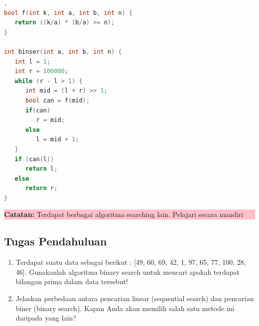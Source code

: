 \begin{lstlisting}[language=c,caption=Implementasi Binary Search],   
bool f(int k, int a, int b, int n) {
   return ((k/a) * (b/a) >= n);
}

int binser(int a, int b, int n) {
   int l = 1;
   int r = 100000;
   while (r - l > 1) {
      int mid = (l + r) >> 1;
      bool can = f(mid);
      if(can)
         r = mid;
      else
         l = mid + 1;
   }
   if (can(l))
      return l;
   else
      return r;
}
\end{lstlisting}

\begin{center}
    \colorbox{pink}{\parbox{0.8\linewidth}{\textbf{Catatan:} Terdapat berbagai algoritma searching lain. Pelajari secara mandiri}}
\end{center}

\subsection{Tugas Pendahuluan}
\begin{enumerate}
    \item Terdapat suatu data sebagai berikut : [49, 60, 69, 42, 1, 97, 65, 77, 100, 28, 46]. Gunakanlah algoritma binary search untuk mencari apakah terdapat bilangan prima dalam data tersebut!
    \item Jelaskan perbedaan antara pencarian linear (sequential search) dan pencarian biner (binary search).
          Kapan Anda akan memilih salah satu metode ini daripada yang lain?
\end{enumerate}
